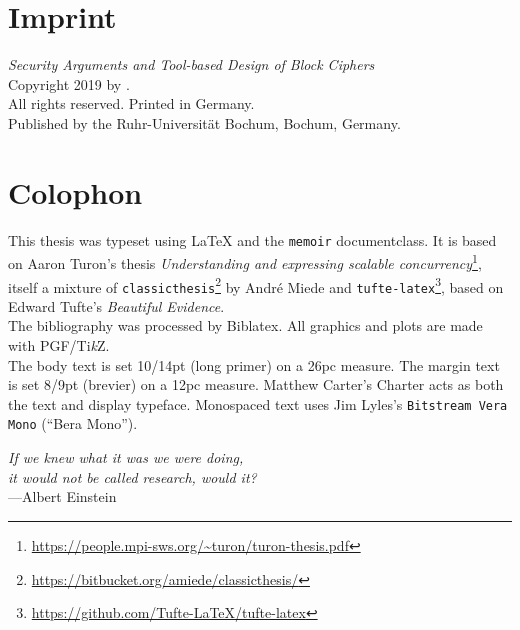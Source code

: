 \clearpage{}

\thispagestyle{empty}
\hphantom{.}
\vfill

\section*{Imprint}

\textit{Security Arguments and Tool-based Design of Block Ciphers}\\
Copyright \textcopyright{} 2019 by \theauthor{}.\\
All rights reserved. Printed in Germany.\\
Published by the Ruhr-Universität Bochum, Bochum, Germany.

\section*{Colophon}

This thesis was typeset using \LaTeX{} and the \texttt{memoir} documentclass.
It is based on Aaron Turon's thesis \emph{Understanding and expressing scalable concurrency}\footnote{\url{https://people.mpi-sws.org/~turon/turon-thesis.pdf}}, itself a mixture of \texttt{classicthesis}\footnote{\url{https://bitbucket.org/amiede/classicthesis/}} by Andr\'e Miede and \texttt{tufte-latex}\footnote{\url{https://github.com/Tufte-LaTeX/tufte-latex}}, based on Edward Tufte's \emph{Beautiful Evidence}.\\[0.5\baselineskip]
%
The bibliography was processed by Biblatex.
All graphics and plots are made with PGF/Ti\emph{k}Z.\\[0.5\baselineskip]
%
The body text is set 10/14pt (long primer) on a 26pc measure.
The margin text is set 8/9pt (brevier) on a 12pc measure.
Matthew Carter's \textrm{Charter} acts as both the text and display typeface.
Monospaced text uses Jim Lyles's \texttt{Bitstream Vera Mono} (\enquote{Bera Mono}).

\clearpage{}

\thispagestyle{empty}
\vphantom{.}
\vfill
{%
    \flushright{}
    \emph{If we knew what it was we were doing,\\
          it would not be called research, would it?}\\
    \hfill---Albert Einstein
}
\vfill
\vfill

\clearpage{}
